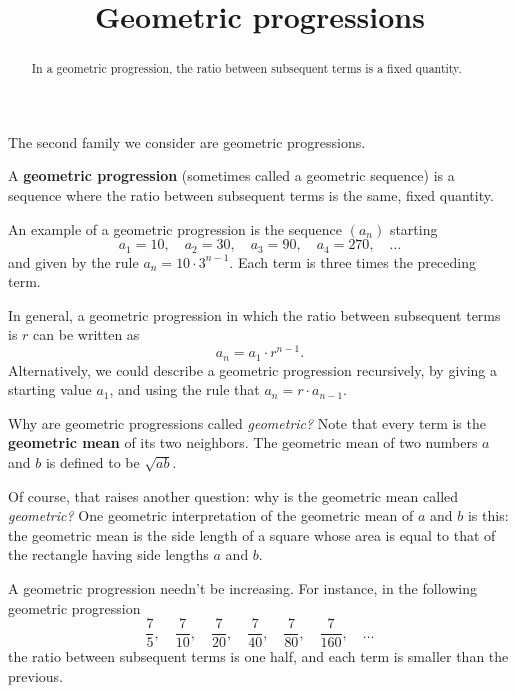 \documentclass{ximera}
\title{Geometric progressions}
\newcommand{\defnword}[1]{\textbf{#1}}
\renewcommand{\index}[1]{}
\begin{document}
\begin{abstract}
  In a geometric progression, the ratio between subsequent terms is
  a fixed quantity.
\end{abstract}

\maketitle

The second family we consider are geometric progressions.


\begin{definition}
  A \defnword{geometric progression} (sometimes called a geometric
  sequence)\index{geometric progression} is a sequence where the ratio
  between subsequent terms is the same, fixed quantity.
\end{definition}

\begin{example}
  An example of a geometric progression is the sequence $(a_n)$ starting
  $$
  a_1 = 10, \quad a_2 = 30, \quad a_3 = 90, \quad a_4 = 270, \quad\ldots
  $$
  and given by the rule $a_n = 10 \cdot 3^{n-1}$.  Each term is three
  times the preceding term.
\end{example}

In general, a geometric progression in which the ratio between
subsequent terms is $r$ can be written as
$$
a_n = a_1 \cdot r^{n-1}.
$$
Alternatively, we could describe a geometric progression
recursively, by giving a starting value $a_1$, and using the rule that
$a_{n} = r \cdot a_{n-1}$.

\begin{remark}
Why are geometric progressions called \textit{geometric?}  Note that every term is the \defnword{geometric mean} of its two neighbors.  The geometric mean of two numbers $a$ and $b$ is defined to be $\sqrt{ab}$.

Of course, that raises another question: why is the geometric mean called \textit{geometric?}  One geometric interpretation of the geometric mean of $a$ and $b$ is this: the geometric mean is the side length of a square whose area is equal to that of the rectangle having side lengths $a$ and $b$.
\end{remark}

A geometric progression needn't be increasing.  For instance, in the following geometric progression
$$
\frac{7}{5}, \quad \frac{7}{10}, \quad \frac{7}{20}, \quad \frac{7}{40}, \quad \frac{7}{80}, \quad \frac{7}{160}, \quad\ldots
$$
the ratio between subsequent terms is one half, and each term is smaller than the previous.
\end{document}
